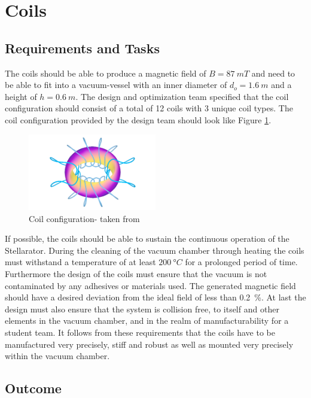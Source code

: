 \section{Coils}
\subsection{Requirements and Tasks}
The coils should be able to produce a magnetic field of $B = \SI{87}{mT}$ and need to be able to fit into a vacuum-vessel with an inner diameter of $d_o=\SI{1.6}{m}$ and a height of $h=\SI{0.6}{m}$.
The design and optimization team specified that the coil configuration should consist of a total of 12 coils with 3 unique coil types.
The coil configuration provided by the design team should look like Figure \ref{fig:config}.
\begin{figure}[h]
    \centering
    \includegraphics[width=0.5\textwidth]{Images/02_Coils/coil_config.png}
    \caption{Coil configuration- taken from \cite{QUASR}}
    \label{fig:config}
\end{figure}
If possible, the coils should be able to sustain the continuous operation of the Stellarator.
During the cleaning of the vacuum chamber through heating the coils must withstand a temperature of at least $\SI{200}{\degree C}$ for a prolonged period of time.
Furthermore the design of the coils must ensure that the vacuum is not contaminated by any adhesives or materials used.
The generated magnetic field should have a desired deviation from the ideal field of less than \SI{0.2}{\%}.
At last the design must also ensure that the system is collision free, to itself and other elements in the vacuum chamber, and in the realm of manufacturability for a student team.
It follows from these requirements that the coils have to be manufactured very precisely, stiff and robust as well as mounted very precisely within the vacuum chamber.


\subsection{Outcome}
